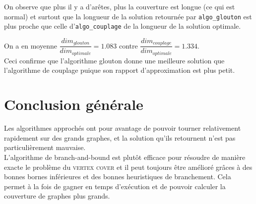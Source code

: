 \documentclass[12pt]{article}
\begin{document}
        On observe que plus il y a d'arêtes, plus la couverture est longue (ce qui est normal) et surtout que la longueur de la solution retournée par \texttt{algo\_glouton} est plus proche que celle d'\texttt{algo\_couplage} de la longueur de la solution optimale.
        
        On a en moyenne $\dfrac{dim_{glouton}}{dim_{optimale}} = 1.083 $ contre $\dfrac{dim_{couplage}}{dim_{optimale}} = 1.334 $. \\
        Ceci confirme que l'algorithme glouton donne une meilleure solution que l'algorithme de couplage puique son rapport d'approximation est plus petit.

\section{Conclusion générale}
    
    Les algorithmes approchés ont pour avantage de pouvoir tourner relativement rapidement sur des grands graphes, et la solution qu'ils retournent n'est pas particulièrement mauvaise. \\

    L'algorithme de branch-and-bound est plutôt efficace pour résoudre de manière exacte le problème du \textsc{vertex cover} et il peut toujours être amélioré grâces à des bonnes bornes inférieures et des bonnes heuristiques de branchement. Cela permet à la fois de gagner en temps d'exécution et de pouvoir calculer la couverture de graphes plus grands.       
\end{document}
